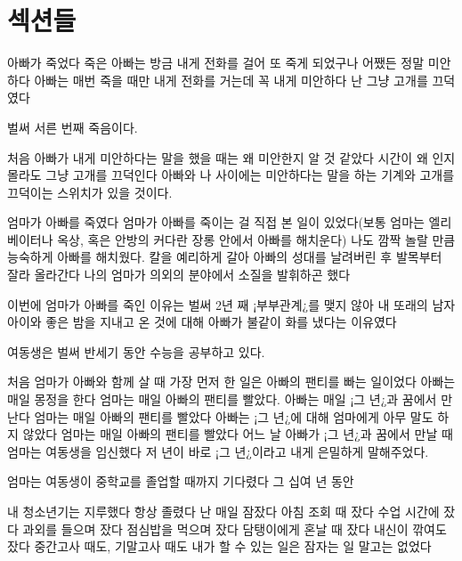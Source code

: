 \hypertarget{uxc139uxc158uxb4e4}{%

\chapter{섹션들}\label{uxc139uxc158uxb4e4}}



아빠가 죽었다 죽은 아빠는 방금 내게 전화를 걸어 또 죽게 되었구나 어쨌든 정말 미안하다 아빠는 매번 죽을 때만 내게 전화를 거는데 꼭 내게 미안하다 난 그냥 고개를 끄덕였다



벌써 서른 번째 죽음이다.



처음 아빠가 내게 미안하다는 말을 했을 때는 왜 미안한지 알 것 같았다 시간이 왜 인지 몰라도 그냥 고개를 끄덕인다 아빠와 나 사이에는 미안하다는 말을 하는 기계와 고개를 끄덕이는 스위치가 있을 것이다.



엄마가 아빠를 죽였다 엄마가 아빠를 죽이는 걸 직접 본 일이 있었다(보통 엄마는 엘리베이터나 옥상, 혹은 안방의 커다란 장롱 안에서 아빠를 해치운다) 나도 깜짝 놀랄 만큼 능숙하게 아빠를 해치웠다. 칼을 예리하게 갈아 아빠의 성대를 날려버린 후 발목부터 잘라 올라간다 나의 엄마가 의외의 분야에서 소질을 발휘하곤 했다



이번에 엄마가 아빠를 죽인 이유는 벌써 2년 째 ¡부부관계¿를 맺지 않아 내 또래의 남자아이와 좋은 밤을 지내고 온 것에 대해 아빠가 불같이 화를 냈다는 이유였다



여동생은 벌써 반세기 동안 수능을 공부하고 있다.



처음 엄마가 아빠와 함께 살 때 가장 먼저 한 일은 아빠의 팬티를 빠는 일이었다 아빠는 매일 몽정을 한다 엄마는 매일 아빠의 팬티를 빨았다. 아빠는 매일 ¡그 년¿과 꿈에서 만난다 엄마는 매일 아빠의 팬티를 빨았다 아빠는 ¡그 년¿에 대해 엄마에게 아무 말도 하지 않았다 엄마는 매일 아빠의 팬티를 빨았다 어느 날 아빠가 ¡그 년¿과 꿈에서 만날 때 엄마는 여동생을 임신했다 저 년이 바로 ¡그 년¿이라고 내게 은밀하게 말해주었다.



엄마는 여동생이 중학교를 졸업할 때까지 기다렸다 그 십여 년 동안



내 청소년기는 지루했다 항상 졸렸다 난 매일 잠잤다 아침 조회 때 잤다 수업 시간에 잤다 과외를 들으며 잤다 점심밥을 먹으며 잤다 담탱이에게 혼날 때 잤다 내신이 깎여도 잤다 중간고사 때도, 기말고사 때도 내가 할 수 있는 일은 잠자는 일 말고는 없었다



